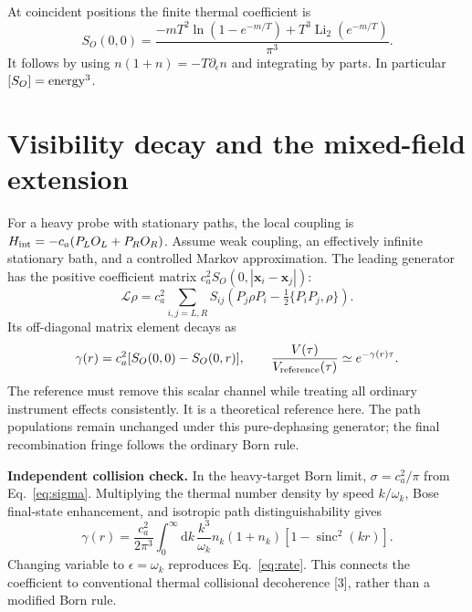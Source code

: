 \documentclass[11pt]{article}
\newcommand{\sinc}{\operatorname{sinc}}
\newcommand{\dd}{\mathrm{d}}
\newcommand{\Li}{\operatorname{Li}}
\begin{document}
At coincident positions the finite thermal coefficient is
\begin{equation}
 S_O(0,0)=\frac{-mT^2\ln(1-e^{-m/T})+T^3\Li_2(e^{-m/T})}{\pi^3}.
 \label{eq:local}
\end{equation}
It follows by using $n(1+n)=-T\partial_\epsilon n$ and integrating
by parts. In particular $[S_O]={\rm energy}^3$.

\newpage
\section{Visibility decay and the mixed-field extension}
For a heavy probe with stationary paths, the local coupling is
$H_{\rm int}=-c_a(P_LO_L+P_RO_R)$. Assume weak coupling, an effectively
infinite stationary bath, and a controlled Markov approximation.
The leading generator has the positive coefficient matrix
$c_a^2S_O(0,|\mathbf x_i-\mathbf x_j|)$:
\begin{equation}
 \mathcal L\rho=c_a^2\sum_{i,j=L,R}S_{ij}
 \left(P_j\rho P_i-\tfrac12\{P_iP_j,\rho\}\right).
\end{equation}
Its off-diagonal matrix element decays as
\begin{equation}
 \gamma(r)=c_a^2[S_O(0,0)-S_O(0,r)],\qquad
 \frac{V(\tau)}{V_{\rm reference}(\tau)}\simeq e^{-\gamma(r)\tau}.
 \label{eq:rate}
\end{equation}
The reference must remove this scalar channel while treating all ordinary
instrument effects consistently. It is a theoretical reference here.
The path populations remain unchanged under this pure-dephasing generator;
the final recombination fringe follows the ordinary Born rule.

\textbf{Independent collision check.} In the heavy-target Born limit,
$\sigma=c_a^2/\pi$ from Eq.~\eqref{eq:sigma}. Multiplying the thermal
number density by speed $k/\omega_k$, Bose final-state enhancement,
and isotropic path distinguishability gives
\begin{equation}
 \gamma(r)=\frac{c_a^2}{2\pi^3}\int_0^\infty\dd k\,
 \frac{k^3}{\omega_k}n_k(1+n_k)[1-\sinc^2(kr)].
\end{equation}
Changing variable to $\epsilon=\omega_k$ reproduces
Eq.~\eqref{eq:rate}. This connects the coefficient to conventional
thermal collisional decoherence [3], rather than a modified Born rule.
\end{document}
